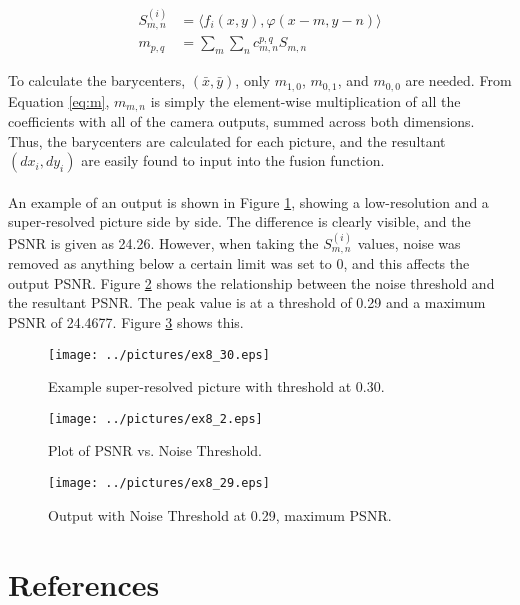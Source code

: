 \documentclass[11pt,a4paper]{report}
\newcommand{\mychapter}[2]
{
    \setcounter{chapter}{#1}
    \setcounter{section}{0}
    \chapter*{#2}
    \addcontentsline{toc}{chapter}{#2}
}
\begin{document}
\begin{align}
    S^{(i)}_{m,n} &= \langle f_i (x, y), \varphi(x -m, y - n) \rangle \label{eq:S}\\
    m_{p,q} &= \sum_{m} \sum_{n} c^{p, q}_{m, n} S_{m,n} \label{eq:m}
\end{align}

To calculate the barycenters, $(\bar{x},\bar{y})$, only $m_{1,0}$, $m_{0,1}$, and $m_{0,0}$ are needed. From Equation \ref{eq:m}, $m_{m,n}$ is simply the element-wise multiplication of all the coefficients with all of the camera outputs, summed across both dimensions. Thus, the barycenters are calculated for each picture, and the resultant $(dx_i, dy_i)$ are easily found to input into the fusion function.
\\\\
An example of an output is shown in Figure \ref{fig:ex8_30}, showing a low-resolution and a super-resolved picture side by side. The difference is clearly visible, and the PSNR is given as 24.26. However, when taking the $S^{(i)}_{m,n}$ values, noise was removed as anything below a certain limit was set to 0, and this affects the output PSNR. Figure \ref{fig:ex8_2} shows the relationship between the noise threshold and the resultant PSNR. The peak value is at a threshold of 0.29 and a maximum PSNR of 24.4677. Figure \ref{fig:ex8_29} shows this.

\begin{figure}[!ht]
    \centering
    \texttt{[image: ../pictures/ex8\_30.eps]}
    \caption{Example super-resolved picture with threshold at 0.30.}
    \label{fig:ex8_30}
\end{figure}

\begin{figure}[!ht]
    \centering
    \texttt{[image: ../pictures/ex8\_2.eps]}
    \caption{Plot of PSNR vs. Noise Threshold.}
    \label{fig:ex8_2}
\end{figure}

\begin{figure}[!ht]
    \centering
    \texttt{[image: ../pictures/ex8\_29.eps]}
    \caption{Output with Noise Threshold at 0.29, maximum PSNR.}
    \label{fig:ex8_29}
\end{figure}

\newpage
\mychapter{9}{References}
\begingroup
   \def\chapter*#1{}


\endgroup
\end{document}
